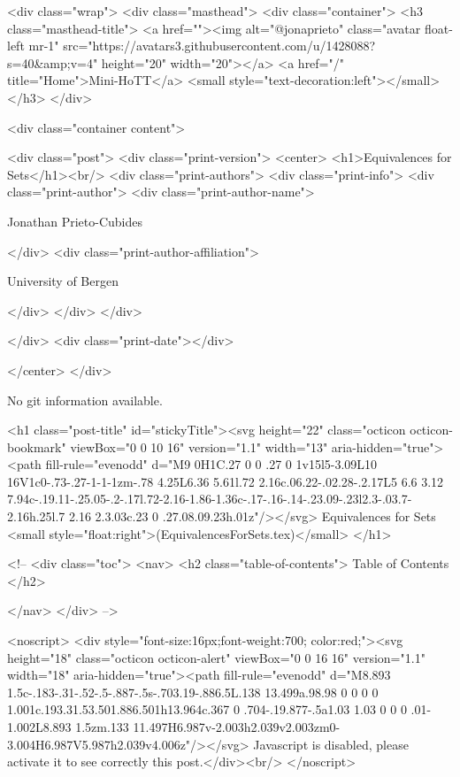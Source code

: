     <div class="wrap">
      <div class="masthead">
        <div class="container">
          <h3 class="masthead-title">
            <a href=""><img alt="@jonaprieto" class="avatar float-left mr-1" src="https://avatars3.githubusercontent.com/u/1428088?s=40&amp;v=4" height="20" width="20"></a>
            <a href="/" title="Home">Mini-HoTT</a>
            <small style="text-decoration:left"></small>
          </h3>
        </div>
      
      <div class="container content">
        







<div class="post">
  <div class="print-version">
    <center>
      <h1>Equivalences for Sets</h1><br/>
        <div class="print-authors">
          <div class="print-info">
            <div class="print-author">
              <div class="print-author-name">
                
                  Jonathan Prieto-Cubides
                
              </div>
              <div class="print-author-affiliation">
                
                  University of Bergen
                
                </div>
            </div>
          </div>
          
          
        </div>
        <div class="print-date"></div>
        
        
    </center>
  </div>

  
  No git information available.
  

  <h1 class="post-title" id="stickyTitle"><svg height="22" class="octicon octicon-bookmark" viewBox="0 0 10 16" version="1.1" width="13" aria-hidden="true"><path fill-rule="evenodd" d="M9 0H1C.27 0 0 .27 0 1v15l5-3.09L10 16V1c0-.73-.27-1-1-1zm-.78 4.25L6.36 5.61l.72 2.16c.06.22-.02.28-.2.17L5 6.6 3.12 7.94c-.19.11-.25.05-.2-.17l.72-2.16-1.86-1.36c-.17-.16-.14-.23.09-.23l2.3-.03.7-2.16h.25l.7 2.16 2.3.03c.23 0 .27.08.09.23h.01z"/></svg> Equivalences for Sets <small style="float:right">(EquivalencesForSets.tex)</small>
  </h1>

  <!-- 
  <div class="toc">
    <nav>
    <h2 class="table-of-contents"> Table of Contents </h2>
      

    </nav>
  </div>
   -->

  <noscript>
  <div style="font-size:16px;font-weight:700; color:red;"><svg height="18" class="octicon octicon-alert" viewBox="0 0 16 16" version="1.1" width="18" aria-hidden="true"><path fill-rule="evenodd" d="M8.893 1.5c-.183-.31-.52-.5-.887-.5s-.703.19-.886.5L.138 13.499a.98.98 0 0 0 0 1.001c.193.31.53.501.886.501h13.964c.367 0 .704-.19.877-.5a1.03 1.03 0 0 0 .01-1.002L8.893 1.5zm.133 11.497H6.987v-2.003h2.039v2.003zm0-3.004H6.987V5.987h2.039v4.006z"/></svg> Javascript is disabled, please activate it to see correctly this post.</div><br/>
  </noscript>

